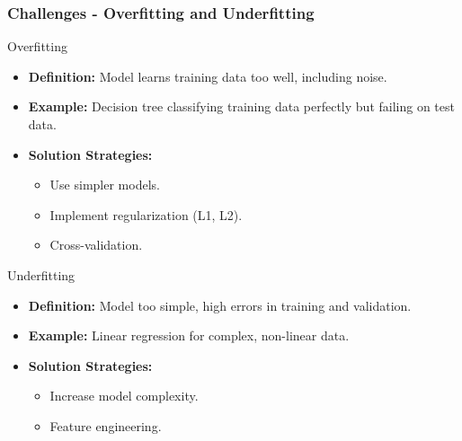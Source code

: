 \documentclass[aspectratio=169]{beamer}
\begin{document}
\begin{frame}[fragile]
    \frametitle{Challenges - Overfitting and Underfitting}
    \begin{block}{Overfitting}
        \begin{itemize}
            \item \textbf{Definition:} Model learns training data too well, including noise.
            \item \textbf{Example:} Decision tree classifying training data perfectly but failing on test data.
            \item \textbf{Solution Strategies:}
            \begin{itemize}
                \item Use simpler models.
                \item Implement regularization (L1, L2).
                \item Cross-validation.
            \end{itemize}
        \end{itemize}
    \end{block}

    \begin{block}{Underfitting}
        \begin{itemize}
            \item \textbf{Definition:} Model too simple, high errors in training and validation.
            \item \textbf{Example:} Linear regression for complex, non-linear data.
            \item \textbf{Solution Strategies:}
            \begin{itemize}
                \item Increase model complexity.
                \item Feature engineering.
            \end{itemize}
        \end{itemize}
    \end{block}
\end{frame}
\end{document}
